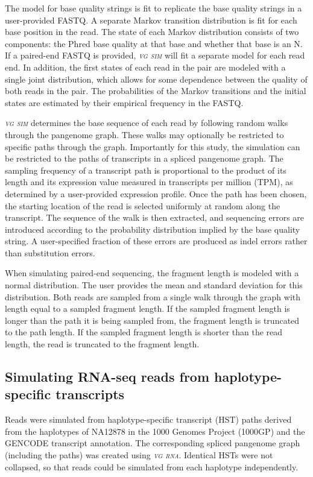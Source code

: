 \documentclass[11pt]{ucthesis}
\newcommand{\tool}[1]{\emph{\textsc{#1}}}
\begin{document}
The model for base quality strings is fit to replicate the base quality strings in a user-provided FASTQ. A separate Markov transition distribution is fit for each base position in the read. The state of each Markov distribution consists of two components: the Phred base quality at that base and whether that base is an N. If a paired-end FASTQ is provided, \tool{vg sim} will fit a separate model for each read end. In addition, the first states of each read in the pair are modeled with a single joint distribution, which allows for some dependence between the quality of both reads in the pair. The probabilities of the Markov transitions and the initial states are estimated by their empirical frequency in the FASTQ.

\tool{vg sim} determines the base sequence of each read by following random walks through the pangenome graph. These walks may optionally be restricted to specific paths through the graph. Importantly for this study, the simulation can be restricted to the paths of transcripts in a spliced pangenome graph. The sampling frequency of a transcript path is proportional to the product of its length and its expression value measured in transcripts per million (TPM), as determined by a user-provided expression profile. Once the path has been chosen, the starting location of the read is selected uniformly at random along the transcript. The sequence of the walk is then extracted, and sequencing errors are introduced according to the probability distribution implied by the base quality string. A user-specified fraction of these errors are produced as indel errors rather than substitution errors.

When simulating paired-end sequencing, the fragment length is modeled with a normal distribution. The user provides the mean and standard deviation for this distribution. Both reads are sampled from a single walk through the graph with length equal to a sampled fragment length. If the sampled fragment length is longer than the path it is being sampled from, the fragment length is truncated to the path length. If the sampled fragment length is shorter than the read length, the read is truncated to the fragment length.

\subsection{Simulating RNA-seq reads from haplotype-specific transcripts}

Reads were simulated from haplotype-specific transcript (HST) paths derived from the haplotypes of NA12878 in the 1000 Genomes Project (1000GP) and the GENCODE transcript annotation. The corresponding spliced pangenome graph (including the paths) was created using \tool{vg rna}. Identical HSTs were not collapsed, so that reads could be simulated from each haplotype independently. 
\end{document}
